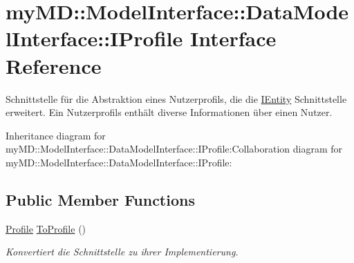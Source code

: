 \hypertarget{interfacemy_m_d_1_1_model_interface_1_1_data_model_interface_1_1_i_profile}{
\section{my\-MD::Model\-Interface::Data\-Model\-Interface::IProfile Interface Reference}
\label{da/d94/interfacemy_m_d_1_1_model_interface_1_1_data_model_interface_1_1_i_profile}
}
Schnittstelle f\"{u}r die Abstraktion eines Nutzerprofils, die die \hyperlink{interfacemy_m_d_1_1_model_interface_1_1_data_model_interface_1_1_i_entity}{IEntity} Schnittstelle erweitert. Ein Nutzerprofils enth\"{a}lt diverse Informationen \"{u}ber einen Nutzer.  


Inheritance diagram for my\-MD::Model\-Interface::Data\-Model\-Interface::IProfile:Collaboration diagram for my\-MD::Model\-Interface::Data\-Model\-Interface::IProfile:\subsection*{Public Member Functions}
\begin{CompactItemize}
\item 
\hyperlink{classmy_m_d_1_1_model_1_1_data_model_1_1_profile}{Profile} \hyperlink{interfacemy_m_d_1_1_model_interface_1_1_data_model_interface_1_1_i_profile_9e2661eb12db275911475edec4a72773}{To\-Profile} ()
\begin{CompactList}\small\item\em Konvertiert die Schnittstelle zu ihrer Implementierung. \item\end{CompactList}\end{CompactItemize}
